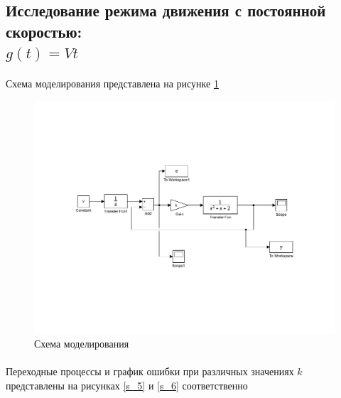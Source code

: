 \documentclass[a4paper,12pt]{article}
\begin{document}
	\subsection{Исследование режима движения с постоянной скоростью:\\ $g(t)=Vt$}
	\paragraph {} Схема моделирования представлена на рисунке \ref{s_4}
	
	\begin{figure}[h]
		\renewcommand{\figurename}{Рисунок}
		\centering
		\includegraphics[width=6in]{Astatism0VMOD.pdf}
		\caption{Схема моделирования}
		\label{s_4}
	\end{figure}
	\newpage 
	\paragraph {}Переходные процессы и график ошибки при различных значениях $k$ представлены на рисунках \ref{s_5} и \ref{s_6} соответственно
	
\end{document}
